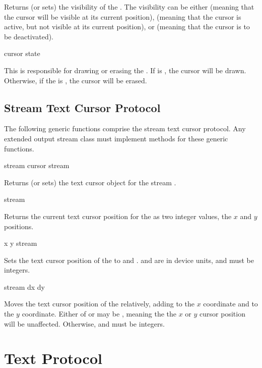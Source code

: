 Returns (or sets) the visibility of the  .  The
visibility can be either  (meaning that the cursor will be visible at
its current position),  (meaning that the cursor is active, but not
visible at its current position), or  (meaning that the cursor is to
be deactivated).

 {cursor state}

This is responsible for drawing or erasing the  .
If  is , the cursor will be drawn.  Otherwise, if the
 is , the cursor will be erased.


\subsection {Stream Text Cursor Protocol}

The following generic functions comprise the stream text cursor protocol.  Any
extended output stream class must implement methods for these generic functions.

 {stream}
 {cursor stream}

Returns (or sets) the text cursor object for the stream .


 {stream}

Returns the current text cursor position for the 
 as two integer values, the $x$ and $y$ positions.

 {x y stream}

Sets the text cursor position of the  
to  and .   and  are in device units, and must be
integers.

 {stream dx dy}

Moves the text cursor position of the  
relatively, adding  to the $x$ coordinate and  to the $y$
coordinate.  Either of  or  may be , meaning the the $x$
or $y$ cursor position will be unaffected.  Otherwise,  and 
must be integers.


\section {Text Protocol}

